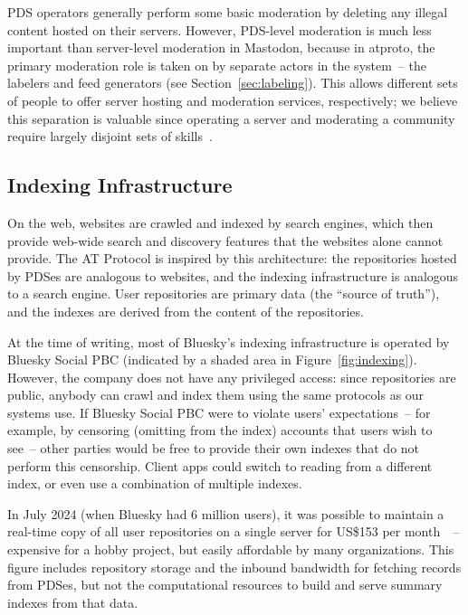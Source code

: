 \documentclass[sigconf]{acmart}
\begin{document}
PDS operators generally perform some basic moderation by deleting any illegal content hosted on their servers.
However, PDS-level moderation is much less important than server-level moderation in Mastodon, because in atproto, the primary moderation role is taken on by separate actors in the system~-- the labelers and feed generators (see Section~\ref{sec:labeling}).
This allows different sets of people to offer server hosting and moderation services, respectively; we believe this separation is valuable since operating a server and moderating a community require largely disjoint sets of skills~\cite{Roth:2023}.

\subsection{Indexing Infrastructure}\label{sec:indexing}

On the web, websites are crawled and indexed by search engines, which then provide web-wide search and discovery features that the websites alone cannot provide.
The AT Protocol is inspired by this architecture: the repositories hosted by PDSes are analogous to websites, and the indexing infrastructure is analogous to a search engine.
User repositories are primary data (the ``source of truth''), and the indexes are derived from the content of the repositories.

At the time of writing, most of Bluesky's indexing infrastructure is operated by Bluesky Social PBC (indicated by a shaded area in Figure~\ref{fig:indexing}).
However, the company does not have any privileged access: since repositories are public, anybody can crawl and index them using the same protocols as our systems use.
If Bluesky Social PBC were to violate users' expectations~-- for example, by censoring (omitting from the index) accounts that users wish to see~-- other parties would be free to provide their own indexes that do not perform this censorship.
Client apps could switch to reading from a different index, or even use a combination of multiple indexes.

In July 2024 (when Bluesky had 6 million users), it was possible to maintain a real-time copy of all user repositories on a single server for US\$153 per month~\cite{NewboldRelay}~-- expensive for a hobby project, but easily affordable by many organizations.
This figure includes repository storage and the inbound bandwidth for fetching records from PDSes, but not the computational resources to build and serve summary indexes from that data.
\end{document}
